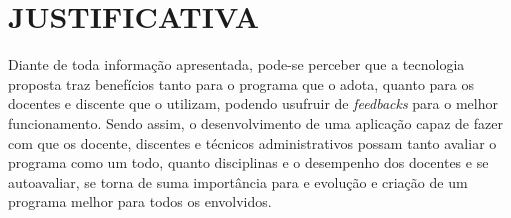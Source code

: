 \chapter{JUSTIFICATIVA}
\label{cap:justificativa}
   Diante de toda informação apresentada, pode-se perceber que a tecnologia proposta traz benefícios tanto para o programa que o adota, quanto para os docentes e discente que o utilizam, podendo usufruir de \textit{feedbacks} para o melhor funcionamento. Sendo assim, o desenvolvimento de uma aplicação capaz de fazer com que os docente, discentes e técnicos administrativos possam tanto avaliar o programa como um todo, quanto disciplinas e o desempenho dos docentes e se autoavaliar, se torna de suma importância para e evolução e criação de um programa melhor para todos os envolvidos.

    
        


